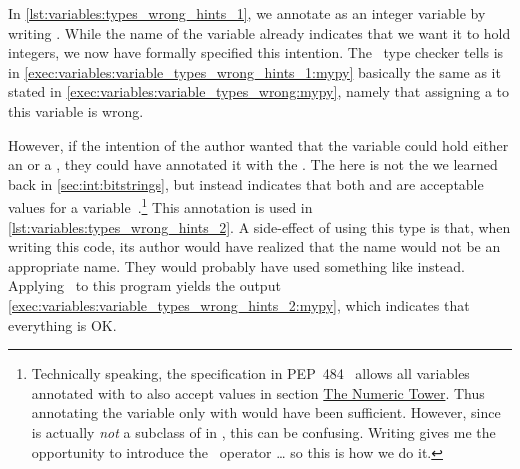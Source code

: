 In \cref{lst:variables:types_wrong_hints_1}, we annotate  as an integer variable by writing .
While the name of the variable already indicates that we want it to hold integers, we now have formally specified this intention.
The \mypy\ type checker tells is in \cref{exec:variables:variable_types_wrong_hints_1:mypy} basically the same as it stated in \cref{exec:variables:variable_types_wrong:mypy}, namely that assigning a  to this variable is wrong.

However, if the intention of the author wanted that the variable could hold either an  or a , they could have annotated it with the  .
The \pythonil{|} here is not the  we learned back in \cref{sec:int:bitstrings}, but instead indicates that both  and  are acceptable values for a variable~\cite{PEP604}.\footnote{%
Technically speaking, the  specification in PEP~484~\cite{PEP484} allows all variables annotated with  to also accept  values in section \href{https://peps.python.org/pep-0484/\#the-numeric-tower}{The Numeric Tower}. %
Thus annotating the variable only with  would have been sufficient. %
However, since  is actually \emph{not} a subclass of  in \python, this can be confusing. %
Writing  gives me the opportunity to introduce the \pythonil{|}~operator {\dots} so this is how we do it.%
}
This annotation is used in \cref{lst:variables:types_wrong_hints_2}.
A side-effect of using this type is that, when writing this code, its author would have realized that the name  would not be an appropriate name.
They would probably have used something like  instead.
Applying \mypy\ to this program yields the output \cref{exec:variables:variable_types_wrong_hints_2:mypy}, which indicates that everything is OK.

